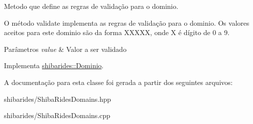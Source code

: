 Metodo que define as regras de validação para o dominio. 

O método validate implementa as regras de validação para o dominio. Os valores aceitos para este dominio são da forma X\+X\+X\+XX, onde X é dígito de 0 a 9.


\begin{DoxyParams}{Parâmetros}
{\em value} & Valor a ser validado \\
\hline
\end{DoxyParams}


Implementa \hyperlink{classshibarides_1_1Dominio_acc9445531455c072bbf708709aebbe55}{shibarides\+::\+Dominio}.



A documentação para esta classe foi gerada a partir dos seguintes arquivos\+:\begin{DoxyCompactItemize}
\item 
shibarides/Shiba\+Rides\+Domains.\+hpp\item 
shibarides/Shiba\+Rides\+Domains.\+cpp\end{DoxyCompactItemize}
